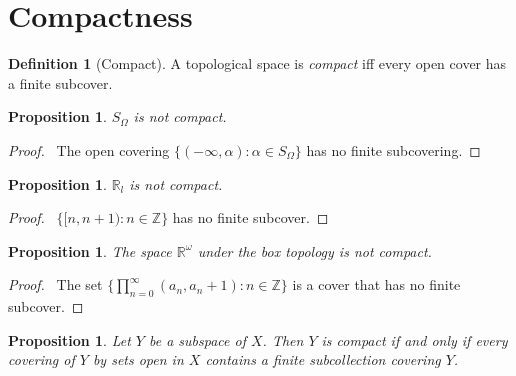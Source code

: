 \documentclass{report}
\let\qed\relax
\newtheorem{prop}[lm]{Proposition}
\theoremstyle{definition}
\newtheorem{df}[lm]{Definition}
\begin{document}
  \section{Compactness}

  \begin{df}[Compact]
    A topological space is \emph{compact} iff every open cover has a finite
    subcover.
  \end{df}

   \begin{prop}
     \label{prop:topology:compact:S_omega}
  $S_\Omega$ is not compact.
 \end{prop}

 \begin{proof}
   \pf\ The open covering $\{ (- \infty, \alpha) : \alpha \in S_\Omega \}$ has
   no finite subcovering. \qed
 \end{proof}

  \begin{prop}
   $\mathbb{R}_l$ is not compact.
 \end{prop}

 \begin{proof}
   \pf\ $\{ [n, n+1) : n \in \mathbb{Z} \}$ has no finite subcover. \qed
 \end{proof}

 \begin{prop}
   The space $\mathbb{R}^\omega$ under the box topology is not compact.
 \end{prop}

 \begin{proof}
   \pf\ The set $\{ \prod_{n=0}^\infty (a_n, a_n+1) : n \in \mathbb{Z}
\}$ is a cover that has no finite subcover. \qed
 \end{proof}

  \begin{prop}
    \label{prop:topology:compact:subspace}
    Let $Y$ be a subspace of $X$. Then $Y$ is compact if and only if every
    covering of $Y$ by sets open in $X$ contains a finite subcollection
    covering
    $Y$.
  \end{prop}
\end{document}
